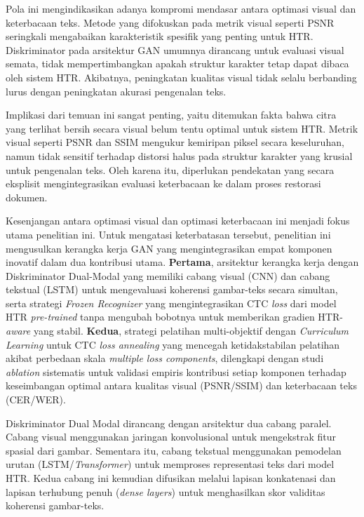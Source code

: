 \vspace{0.8em}
Pola ini mengindikasikan adanya kompromi mendasar antara optimasi visual dan keterbacaan teks. Metode yang difokuskan pada metrik visual seperti PSNR seringkali mengabaikan karakteristik spesifik yang penting untuk HTR. Diskriminator pada arsitektur GAN umumnya dirancang untuk evaluasi visual semata, tidak mempertimbangkan apakah struktur karakter tetap dapat dibaca oleh sistem HTR. Akibatnya, peningkatan kualitas visual tidak selalu berbanding lurus dengan peningkatan akurasi pengenalan teks.

\vspace{0.8em}
Implikasi dari temuan ini sangat penting, yaitu ditemukan fakta bahwa  citra yang terlihat bersih secara visual belum tentu optimal untuk sistem HTR. Metrik visual seperti PSNR dan SSIM mengukur kemiripan piksel secara keseluruhan, namun tidak sensitif terhadap distorsi halus pada struktur karakter yang krusial untuk pengenalan teks. Oleh karena itu, diperlukan pendekatan yang secara eksplisit mengintegrasikan evaluasi keterbacaan ke dalam proses restorasi dokumen.

\vspace{0.5cm}  %
Kesenjangan antara optimasi visual dan optimasi keterbacaan ini menjadi fokus utama penelitian ini. Untuk mengatasi keterbatasan tersebut, penelitian ini mengusulkan kerangka kerja GAN yang mengintegrasikan empat komponen inovatif dalam dua kontribusi utama. \textbf{Pertama}, arsitektur kerangka kerja dengan Diskriminator Dual-Modal yang memiliki cabang visual (CNN) dan cabang tekstual (LSTM) untuk mengevaluasi koherensi gambar-teks secara simultan, serta strategi \textit{Frozen Recognizer} yang mengintegrasikan CTC \textit{loss} dari model HTR \textit{pre-trained} tanpa mengubah bobotnya untuk memberikan gradien HTR-\textit{aware} yang stabil. \textbf{Kedua}, strategi pelatihan multi-objektif dengan \textit{Curriculum Learning} untuk CTC \textit{loss annealing} yang mencegah ketidakstabilan pelatihan akibat perbedaan skala \textit{multiple loss components}, dilengkapi dengan studi \textit{ablation} sistematis untuk validasi empiris kontribusi setiap komponen terhadap keseimbangan optimal antara kualitas visual (PSNR/SSIM) dan keterbacaan teks (CER/WER).

\vspace{0.8em}
Diskriminator Dual Modal dirancang dengan arsitektur dua cabang paralel. Cabang visual menggunakan jaringan konvolusional untuk mengekstrak fitur spasial dari gambar. Sementara itu, cabang tekstual menggunakan pemodelan urutan (LSTM/\textit{Transformer}) untuk memproses representasi teks dari model HTR. Kedua cabang ini kemudian difusikan melalui lapisan konkatenasi dan lapisan terhubung penuh (\textit{dense layers}) untuk menghasilkan skor validitas koherensi gambar-teks.

